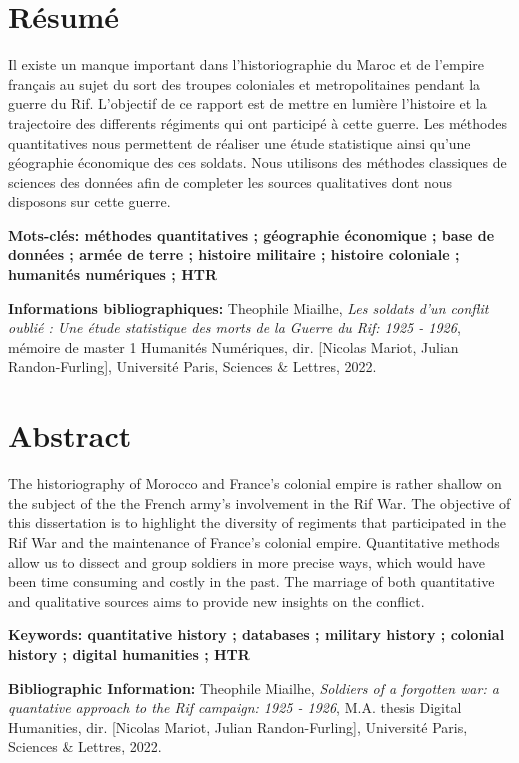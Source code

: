 \section*{Résumé}
 Il existe un manque important dans l'historiographie du Maroc et de l'empire français au sujet du sort des troupes coloniales et metropolitaines pendant la guerre du Rif. L'objectif de ce rapport est de mettre en lumière l'histoire et la trajectoire des differents régiments qui ont participé à cette guerre. Les méthodes quantitatives nous permettent de réaliser une étude statistique ainsi qu'une géographie économique des ces soldats. Nous utilisons des méthodes classiques de sciences des données afin de completer les sources qualitatives dont nous disposons sur cette guerre. 

\medskip

\textbf{Mots-clés: méthodes quantitatives ; géographie économique ; base de données ; armée de terre ; histoire militaire ; histoire coloniale ; humanités numériques ; HTR}

\textbf{Informations bibliographiques:} Theophile Miailhe, \textit{Les soldats d'un conflit oublié : Une étude statistique des morts de la Guerre du Rif: 1925 - 1926}, mémoire de master 1 \og Humanités Numériques\fg{}, dir. [Nicolas Mariot, Julian Randon-Furling], Université Paris, Sciences \& Lettres, 2022.


\section*{Abstract}
The historiography of Morocco and France's colonial empire is rather shallow on the subject of the the French army's involvement in the Rif War. The objective of this dissertation is to highlight the diversity of regiments  that participated in the Rif War and the maintenance of France's colonial empire. Quantitative methods allow us to dissect and group soldiers in more precise ways, which would have been time consuming and costly in the past. The marriage of both quantitative and qualitative sources aims to provide new insights on the conflict. 

\medskip

\textbf{Keywords: quantitative history ; databases ; military history ; colonial history ; digital humanities ; HTR}

\textbf{Bibliographic Information:} Theophile Miailhe, \textit{Soldiers of a forgotten war: a quantative approach to the Rif campaign: 1925 - 1926}, M.A. thesis \og Digital Humanities\fg{}, dir. [Nicolas Mariot, Julian Randon-Furling], Université Paris, Sciences \& Lettres, 2022.

\clearpage